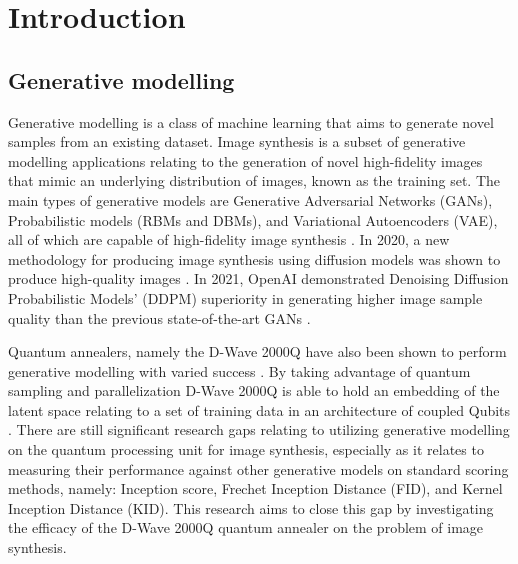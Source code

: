 \documentclass[%
 reprint,
 amsmath,amssymb,
 aps,
]{revtex4-2}
\begin{document}
\maketitle


\section{Introduction}
\subsection{Generative modelling}
\noindent
Generative modelling is a class of machine learning that aims to generate novel samples from an existing dataset. Image synthesis is a subset of generative modelling applications relating to the generation of novel high-fidelity images that mimic an underlying distribution of images, known as the training set. The main types of generative models are Generative Adversarial Networks (GANs), Probabilistic models (RBMs and DBMs), and Variational Autoencoders (VAE), all of which are capable of high-fidelity image synthesis \cite{weng2021diffusion}. In 2020, a new methodology for producing image synthesis using diffusion models was shown to produce high-quality images \cite{ho2020denoising}. In 2021, OpenAI demonstrated Denoising Diffusion Probabilistic Models' (DDPM) superiority in generating higher image sample quality than the previous state-of-the-art GANs \cite{dhariwal2021diffusion}. 

Quantum annealers, namely the D-Wave 2000Q have also been shown to perform generative modelling with varied success \cite{Jain2020}\cite{Thulasidasan2016}. By taking advantage of quantum sampling and parallelization D-Wave 2000Q is able to hold an embedding of the latent space relating to a set of training data in an architecture of coupled Qubits \cite{Amin_2018}. There are still significant research gaps relating to utilizing generative modelling on the quantum processing unit for image synthesis, especially as it relates to measuring their performance against other generative models on standard scoring methods, namely: Inception score, Frechet Inception Distance (FID), and Kernel Inception Distance (KID). This research aims to close this gap by investigating the efficacy of the D-Wave 2000Q quantum annealer on the problem of image synthesis.
\end{document}

